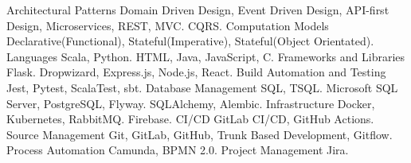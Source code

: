  \begin{cvskills}
    \cvskill
      {Architectural Patterns} 
      { Domain Driven Design, Event Driven Design, API-first Design, Microservices, REST, MVC.}
    \cvskill
      {} 
      { CQRS.}
    \cvskill
      {Computation Models} 
      { Declarative(Functional), Stateful(Imperative), Stateful(Object Orientated).} 
    \cvskill
      {Languages} 
      { Scala, Python.}
    \cvskill
      {} 
      {  HTML, Java, JavaScript, C.}
    \cvskill
      {Frameworks and Libraries} 
      { Flask.}
    \cvskill
      {} 
      { Dropwizard, Express.js, Node.js, React.}
    \cvskill
      {Build Automation and Testing} 
      { Jest, Pytest, ScalaTest, sbt.} 
    \cvskill
      {Database Management} 
      { SQL, TSQL.}
    \cvskill
      {} 
      { Microsoft SQL Server, PostgreSQL, Flyway.}
    \cvskill
      {} 
      { SQLAlchemy, Alembic.}
    \cvskill
      {Infrastructure} 
      { Docker, Kubernetes, RabbitMQ.} 
    \cvskill
      {} 
      { Firebase.} 
    \cvskill
      {CI/CD} 
      { GitLab CI/CD, GitHub Actions.} 
    \cvskill
      {Source Management} 
      { Git, GitLab, GitHub, Trunk Based Development, Gitflow.} 
    \cvskill
      {Process Automation}
      { Camunda, BPMN 2.0.}
    \cvskill
      {Project Management} 
      { Jira.} 
  \end{cvskills}
